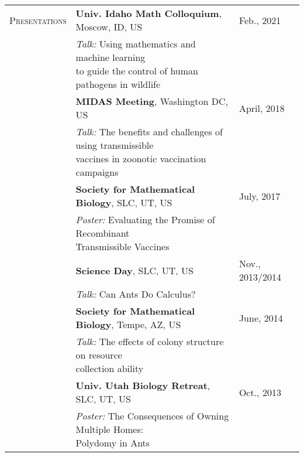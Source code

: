 \documentclass[11pt]{article}
\newcommand{\cellone}{3.5cm} %
\newcommand{\celltwo}{11cm}
\newcommand{\cellthree}{4cm}
\begin{document}
\begin{tabularx}{\textwidth}{p{\cellone} p{\celltwo} p{\cellthree}}
  \parbox[t][0cm]{\cellone}{P\textsc{resentations}}  & \parbox[t][]{\celltwo}{{\bf Univ. Idaho Math Colloquium}, Moscow, ID, US} & \parbox[t][]{\cellthree}{Feb., 2021} \\ 
  & \hspace{.2in} \parbox[t][]{\celltwo}{ \emph{Talk: } Using mathematics and machine learning \\to
guide the control of human pathogens in
wildlife} \\

  & \vspace{0.1in} \parbox[t][]{\celltwo}{{\bf MIDAS Meeting}, Washington DC, US} & \vspace{0.1in} \parbox[t][]{\cellthree}{April, 2018} \\ 
  & \hspace{.2in} \parbox[t][]{\celltwo}{ \emph{Talk: } The benefits and challenges of using transmissible \\
  vaccines in zoonotic vaccination campaigns} \\

  & \vspace{0.1in} \parbox[t][]{\celltwo}{{\bf Society for Mathematical Biology}, SLC, UT, US} & \vspace{0.1in} \parbox[t][]{\cellthree}{July, 2017} \\ 
  & \hspace{.2in} \parbox[t][]{\celltwo}{ \emph{Poster: } Evaluating the Promise of Recombinant \\ Transmissible Vaccines} \\

  
  & \vspace{0.1in} \parbox[t][]{\celltwo}{{\bf Science Day}, SLC, UT, US} & \vspace{0.1in} \parbox[t][]{\cellthree}{Nov., 2013/2014} \\ 
  & \hspace{.2in} \parbox[t][]{\celltwo}{ \emph{Talk: } Can Ants Do Calculus?}\\
  
  
  & \vspace{0.1in} \parbox[t][]{\celltwo}{{\bf Society for Mathematical Biology}, Tempe, AZ, US} & \vspace{0.1in} \parbox[t][]{\cellthree}{June, 2014} \\ 
  & \hspace{.2in} \parbox[t][]{\celltwo}{ \emph{Talk: } The effects of colony structure on resource \\ collection ability} \\
  
											 
  & \vspace{0.1in} \parbox[t][0cm]{\celltwo}{{\bf Univ. Utah Biology Retreat}, SLC, UT, US } & \vspace{0.1in} \parbox[t][]{\cellthree}{Oct., 2013} \\
  & \hspace{.2in} \parbox[t][]{\celltwo}{\emph{Poster:} The Consequences of Owning Multiple Homes: \\ Polydomy in Ants}
\end{tabularx}
\end{document}
